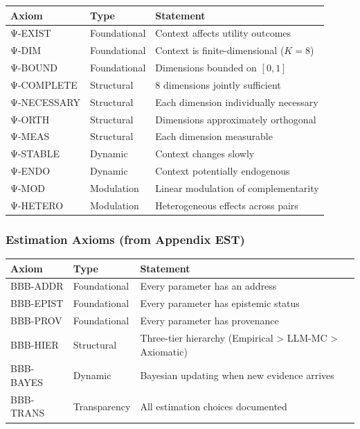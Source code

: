 \begin{center}
\small
\renewcommand{\arraystretch}{1.2}
\begin{tabular}{@{}llp{7cm}@{}}
\toprule
\textbf{Axiom} & \textbf{Type} & \textbf{Statement} \\
\midrule
Ψ-EXIST & Foundational & Context affects utility outcomes \\
Ψ-DIM & Foundational & Context is finite-dimensional ($K=8$) \\
Ψ-BOUND & Foundational & Dimensions bounded on $[0,1]$ \\
Ψ-COMPLETE & Structural & 8 dimensions jointly sufficient \\
Ψ-NECESSARY & Structural & Each dimension individually necessary \\
Ψ-ORTH & Structural & Dimensions approximately orthogonal \\
Ψ-MEAS & Structural & Each dimension measurable \\
Ψ-STABLE & Dynamic & Context changes slowly \\
Ψ-ENDO & Dynamic & Context potentially endogenous \\
Ψ-MOD & Modulation & Linear modulation of complementarity \\
Ψ-HETERO & Modulation & Heterogeneous effects across pairs \\
\bottomrule
\end{tabular}
\end{center}

\subsubsection{Estimation Axioms (from Appendix EST)}

\begin{center}
\small
\renewcommand{\arraystretch}{1.2}
\begin{tabular}{@{}llp{7cm}@{}}
\toprule
\textbf{Axiom} & \textbf{Type} & \textbf{Statement} \\
\midrule
BBB-ADDR & Foundational & Every parameter has an address \\
BBB-EPIST & Foundational & Every parameter has epistemic status \\
BBB-PROV & Foundational & Every parameter has provenance \\
BBB-HIER & Structural & Three-tier hierarchy (Empirical > LLM-MC > Axiomatic) \\
BBB-BAYES & Dynamic & Bayesian updating when new evidence arrives \\
BBB-TRANS & Transparency & All estimation choices documented \\
\bottomrule
\end{tabular}
\end{center}

